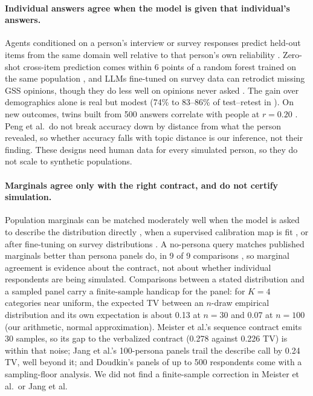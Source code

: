 \documentclass[11pt]{article}
\begin{document}
\paragraph{Individual answers agree when the model is given that individual's answers.} Agents conditioned on a person's interview or survey responses predict held-out items from the same domain well relative to that person's own reliability \citep{park2024,toubia2025twin}. Zero-shot cross-item prediction comes within 6 points of a random forest trained on the same population \citep{ku2026}, and LLMs fine-tuned on survey data can retrodict missing GSS opinions, though they do less well on opinions never asked \citep{kim2023augmented}. The gain over demographics alone is real but modest (74\% to 83--86\% of test--retest in \citealp{park2024}). On new outcomes, twins built from 500 answers correlate with people at $r = 0.20$ \citep{peng2025funhouse}. Peng et al.\ do not break accuracy down by distance from what the person revealed, so whether accuracy falls with topic distance is our inference, not their finding. These designs need human data for every simulated person, so they do not scale to synthetic populations.

\paragraph{Marginals agree only with the right contract, and do not certify simulation.} Population marginals can be matched moderately well when the model is asked to describe the distribution directly \citep{meister2024,jang2026}, when a supervised calibration map is fit \citep{kambhatla2025}, or after fine-tuning on survey distributions \citep{suh2025subpop,cao2025}. A no-persona query matches published marginals better than persona panels do, in 9 of 9 comparisons \citep{doudkin2026}, so marginal agreement is evidence about the contract, not about whether individual respondents are being simulated. Comparisons between a stated distribution and a sampled panel carry a finite-sample handicap for the panel: for $K = 4$ categories near uniform, the expected TV between an $n$-draw empirical distribution and its own expectation is about 0.13 at $n = 30$ and 0.07 at $n = 100$ (our arithmetic, normal approximation). Meister et al.'s sequence contract emits 30 samples, so its gap to the verbalized contract (0.278 against 0.226 TV) is within that noise; Jang et al.'s 100-persona panels trail the describe call by 0.24 TV, well beyond it; and Doudkin's panels of up to 500 respondents come with a sampling-floor analysis. We did not find a finite-sample correction in Meister et al.\ or Jang et al.
\end{document}
